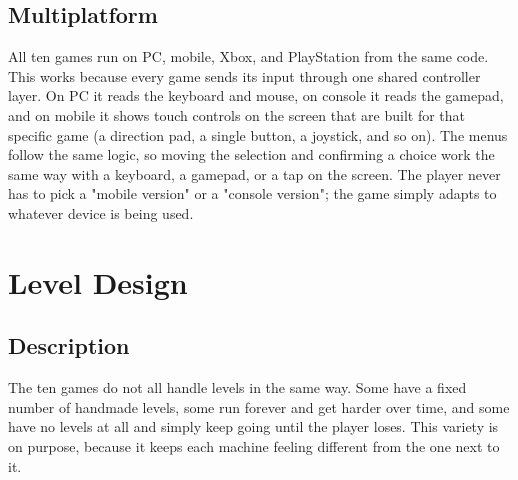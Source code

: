 \documentclass[12pt,letterpaper]{article}
\begin{document}
\subsection{Multiplatform}

All ten games run on PC, mobile, Xbox, and PlayStation from the same code. This works because every game sends its input through one shared controller layer. On PC it reads the keyboard and mouse, on console it reads the gamepad, and on mobile it shows touch controls on the screen that are built for that specific game (a direction pad, a single button, a joystick, and so on). The menus follow the same logic, so moving the selection and confirming a choice work the same way with a keyboard, a gamepad, or a tap on the screen. The player never has to pick a "mobile version" or a "console version"; the game simply adapts to whatever device is being used.

\section{Level Design}

\subsection{Description}

The ten games do not all handle levels in the same way. Some have a fixed number of handmade levels, some run forever and get harder over time, and some have no levels at all and simply keep going until the player loses. This variety is on purpose, because it keeps each machine feeling different from the one next to it.
\end{document}
